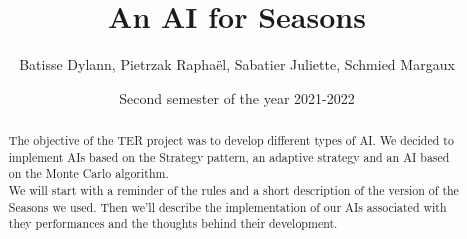 \documentclass{rapport}
\title{An AI for Seasons}
\author{Batisse Dylann, Pietrzak Raphaël, Sabatier Juliette, Schmied Margaux}
\date{Second semester of the year 2021-2022}
\begin{document}
    \maketitle
    
    \clearpage
    \tableofcontents
    
    \newpage
    \begin{abstract}
    The objective of the TER project was to develop different types of AI. We decided to implement AIs based on the Strategy pattern, an adaptive strategy and an AI based on the Monte Carlo algorithm.\\
    We will start with a reminder of the rules and a short description of the version of the Seasons we used. Then we'll describe the implementation of our AIs associated with they performances and the thoughts behind their development.
    \end{abstract}
    
    
    
    

    

    
    

    
    

    

 
\end{document}
